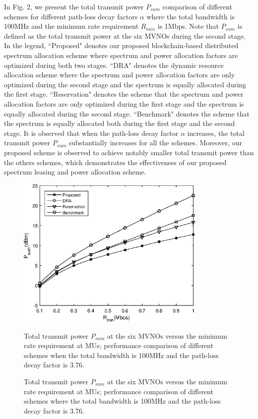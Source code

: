 \documentclass[journal]{IEEEtran}
\begin{document}
\begin{IEEEkeywords}
In Fig. 2, we present the total transmit power $P_{sum}$ comparison of different schemes for different path-loss decay factors $\alpha$ where the total bandwidth is 100MHz and the minimum rate requirement $R_{min}$ is 1Mbps. Note that $P_{sum}$ is defined as the total transmit power at the six MVNOs during the second stage. In the legend, ``Proposed" denotes our proposed blockchain-based distributed spectrum allocation scheme where spectrum and power allocation factors are optimized during both two stages. ``DRA" denotes the dynamic resource allocation scheme where the spectrum and power allocation factors are only optimized during the second stage and the spectrum is equally allocated during the first stage. ``Reservation" denotes the scheme that the spectrum and power allocation factors are only optimized during the first stage and the spectrum is equally allocated during the second stage. ``Benchmark" denotes the scheme that the spectrum is equally allocated both during the first stage and the second stage. It is observed that when the path-loss decay factor $\alpha$ increases, the total transmit power $P_{sum}$ substantially increases for all the schemes. Moreover, our proposed scheme is observed to achieve notably smaller total transmit power than the others schemes, which demonstrates the effectiveness of our proposed spectrum leasing and power allocation scheme.


\begin{figure}
	\centering
	\includegraphics[width=3.6in]{P_rmin.eps}
	\caption{Total transmit power $P_{sum}$ at the six MVNOs versus the minimum rate requirement at MUs; performance comparison of different schemes when the total bandwidth is 100MHz and the path-loss decay factor is 3.76.}
	\caption{Total transmit power $P_{sum}$ at the six MVNOs versus the minimum rate requirement at MUs; performance comparison of different schemes where the total bandwidth is 100MHz and the path-loss decay factor is 3.76.}
\end{figure}


\end{IEEEkeywords}
\end{document}
